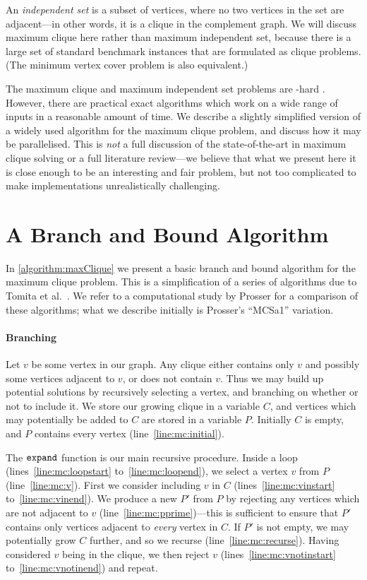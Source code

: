 \documentclass[a4paper]{article}
\newcommand{\expand}{\FuncSty{expand}}
\newcommand{\mcline}[1]{line~\ref{line:mc:#1}}
\newcommand{\mclinerange}[2]{lines~\ref{line:mc:#1} to~\ref{line:mc:#2}}
\begin{document}
An \emph{independent set} is a subset of vertices, where no two vertices in the set are
adjacent---in other words, it is a clique in the complement graph. We will discuss maximum clique
here rather than maximum independent set, because there is a large set of standard benchmark
instances that are formulated as clique problems. (The minimum vertex cover problem is also
equivalent.)

The maximum clique and maximum independent set problems are \NP-hard \cite{Garey:1979}. However,
there are practical exact algorithms which work on a wide range of inputs in a reasonable amount of
time. We describe a slightly simplified version of a widely used algorithm for the maximum clique
problem, and discuss how it may be parallelised. This is \emph{not} a full discussion of the
state-of-the-art in maximum clique solving or a full literature review---we believe that what we
present here it is close enough to be an interesting and fair problem, but not too complicated to
make implementations unrealistically challenging.

\endgroup %

\section{A Branch and Bound Algorithm}

In \vref{algorithm:maxClique} we present a basic branch and bound algorithm for the maximum clique
problem. This is a simplification of a series of algorithms due to Tomita et al.\
\cite{Tomita:2003,Tomita:2007,Tomita:2010}. We refer to a computational study by Prosser
\cite{Prosser:2012} for a comparison of these algorithms; what we describe initially is Prosser's
``MCSa1'' variation.

\paragraph{Branching} Let $v$ be some vertex in our graph. Any clique either contains only
$v$ and possibly some vertices adjacent to $v$, or does not contain $v$. Thus we may build up
potential solutions by recursively selecting a vertex, and branching on whether or not to include
it. We store our growing clique in a variable $C$, and vertices which may potentially be added to
$C$ are stored in a variable $P$.  Initially $C$ is empty, and $P$ contains every vertex
(\mcline{initial}).

The $\expand$ function is our main recursive procedure. Inside a loop
(\mclinerange{loopstart}{loopend}), we select a vertex $v$ from $P$ (\mcline{v}). First we consider
including $v$ in $C$ (\mclinerange{vinstart}{vinend}). We produce a new $P'$ from $P$ by rejecting
any vertices which are not adjacent to $v$ (\mcline{pprime})---this is sufficient to ensure that
$P'$ contains only vertices adjacent to \emph{every} vertex in $C$. If $P'$ is not empty, we may
potentially grow $C$ further, and so we recurse (\mcline{recurse}).  Having considered $v$ being in
the clique, we then reject $v$ (\mclinerange{vnotinstart}{vnotinend}) and repeat.
\end{document}
